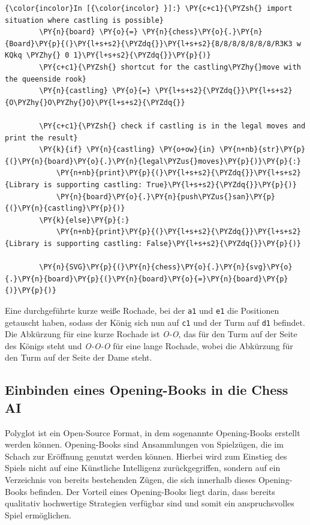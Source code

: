     \begin{Verbatim}[commandchars=\\\{\}]
{\color{incolor}In [{\color{incolor} }]:} \PY{c+c1}{\PYZsh{} import situation where castling is possible}
        \PY{n}{board} \PY{o}{=} \PY{n}{chess}\PY{o}{.}\PY{n}{Board}\PY{p}{(}\PY{l+s+s2}{\PYZdq{}}\PY{l+s+s2}{8/8/8/8/8/8/8/R3K3 w KQkq \PYZhy{} 0 1}\PY{l+s+s2}{\PYZdq{}}\PY{p}{)}
        \PY{c+c1}{\PYZsh{} shortcut for the castling\PYZhy{}move with the queenside rook}
        \PY{n}{castling} \PY{o}{=} \PY{l+s+s2}{\PYZdq{}}\PY{l+s+s2}{O\PYZhy{}O\PYZhy{}O}\PY{l+s+s2}{\PYZdq{}}
        
        \PY{c+c1}{\PYZsh{} check if castling is in the legal moves and print the result}
        \PY{k}{if} \PY{n}{castling} \PY{o+ow}{in} \PY{n+nb}{str}\PY{p}{(}\PY{n}{board}\PY{o}{.}\PY{n}{legal\PYZus{}moves}\PY{p}{)}\PY{p}{:}
            \PY{n+nb}{print}\PY{p}{(}\PY{l+s+s2}{\PYZdq{}}\PY{l+s+s2}{Library is supporting castling: True}\PY{l+s+s2}{\PYZdq{}}\PY{p}{)}
            \PY{n}{board}\PY{o}{.}\PY{n}{push\PYZus{}san}\PY{p}{(}\PY{n}{castling}\PY{p}{)}
        \PY{k}{else}\PY{p}{:}
            \PY{n+nb}{print}\PY{p}{(}\PY{l+s+s2}{\PYZdq{}}\PY{l+s+s2}{Library is supporting castling: False}\PY{l+s+s2}{\PYZdq{}}\PY{p}{)}
        
        \PY{n}{SVG}\PY{p}{(}\PY{n}{chess}\PY{o}{.}\PY{n}{svg}\PY{o}{.}\PY{n}{board}\PY{p}{(}\PY{n}{board}\PY{o}{=}\PY{n}{board}\PY{p}{)}\PY{p}{)} 
\end{Verbatim}


    Eine durchgeführte kurze weiße Rochade, bei der \texttt{a1} und
\texttt{e1} die Positionen getauscht haben, sodass der König sich nun
auf \texttt{c1} und der Turm auf \texttt{d1} befindet. Die Abkürzung für
eine kurze Rochade ist \emph{O-O}, das für den Turm auf der Seite des
Königs steht und \emph{O-O-O} für eine lange Rochade, wobei die
Abkürzung für den Turm auf der Seite der Dame steht.

    \subsection{Einbinden eines Opening-Books in die Chess
AI}\label{einbinden-eines-opening-books-in-die-chess-ai}

Polyglot ist ein Open-Source Format, in dem sogenannte Opening-Books
erstellt werden können. Opening-Books sind Ansammlungen von Spielzügen,
die im Schach zur Eröffnung genutzt werden können. Hierbei wird zum
Einstieg des Spiels nicht auf eine Künstliche Intelligenz
zurückgegriffen, sondern auf ein Verzeichnis von bereits bestehenden
Zügen, die sich innerhalb dieses Opening-Books befinden. Der Vorteil
eines Opening-Books liegt darin, dass bereits qualitativ hochwertige
Strategien verfügbar sind und somit ein anspruchsvolles Spiel
ermöglichen.

